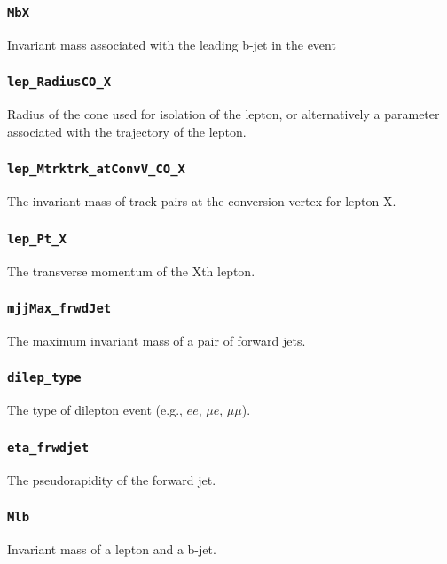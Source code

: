 \subsubsection{\texttt{MbX}} Invariant mass associated with the leading b-jet in the event

\subsubsection{\texttt{lep\_RadiusCO\_X}} Radius of the cone used for isolation of the lepton, or
alternatively a parameter associated with the trajectory of the lepton.

\subsubsection{\texttt{lep\_Mtrktrk\_atConvV\_CO\_X}} The invariant mass of track pairs at the conversion vertex for lepton
X.


\subsubsection{\texttt{lep\_Pt\_X}} The transverse momentum of the Xth lepton.

\subsubsection{\texttt{mjjMax\_frwdJet}} The maximum invariant mass of a pair of forward jets.

\subsubsection{\texttt{dilep\_type}} The type of dilepton event (e.g., $ee$, $\mu e$, $\mu \mu$).

\subsubsection{\texttt{eta\_frwdjet}} The pseudorapidity of the forward jet.

\subsubsection{\texttt{Mlb}} Invariant mass of a lepton and a b-jet.

